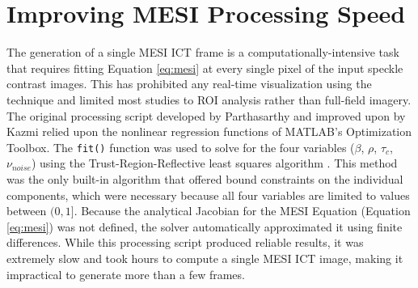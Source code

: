 \section{Improving MESI Processing Speed}

The generation of a single MESI ICT frame is a computationally-intensive task that requires fitting Equation \ref{eq:mesi} at every single pixel of the input speckle contrast images. This has prohibited any real-time visualization using the technique and limited most studies to ROI analysis rather than full-field imagery. The original processing script developed by Parthasarthy \cite{Parthasarthy:2010uf} and improved upon by Kazmi \cite{Kazmi:2014vi} relied upon the nonlinear regression functions of MATLAB’s Optimization Toolbox. The \texttt{fit()} function was used to solve for the four variables ($\beta$, $\rho$, $\tau_c$, $\nu_{noise}$) using the Trust-Region-Reflective least squares algorithm \cite{Yuan:1999tk}. This method was the only built-in algorithm that offered bound constraints on the individual components, which were necessary because all four variables are limited to values between $(0,1]$. Because the analytical Jacobian for the MESI Equation (Equation \ref{eq:mesi}) was not defined, the solver automatically approximated it using finite differences. While this processing script produced reliable results, it was extremely slow and took hours to compute a single MESI ICT image, making it impractical to generate more than a few frames.

\begin{table}
    \caption[Comparison of MESI processing speeds]{
        Comparison of processing speeds on a 1194 x 994 pixel MESI frame.
    }
    \label{tab:mesispeed}
    \centering
\end{table}

